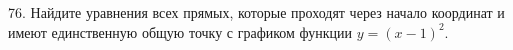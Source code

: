 76. Найдите уравнения всех прямых, которые проходят через начало координат и имеют единственную общую точку с графиком функции $y=(x-1)^2.$\\
